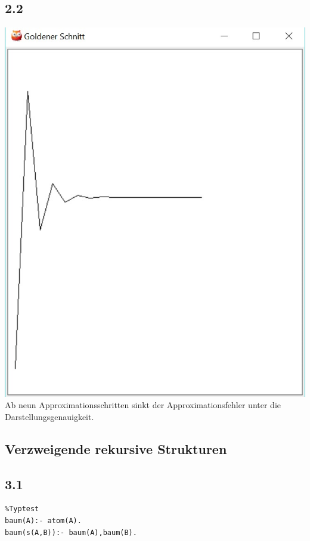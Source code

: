 \documentclass[a4paper, 11pt]{article}
\begin{document}
\newpage

\subsection*{2.2}

\includegraphics{display.png}\\

Ab neun Approximationsschritten sinkt der Approximationsfehler unter die Darstellungsgenauigkeit.

\subsection{Verzweigende rekursive Strukturen}

\subsection*{3.1}

\begin{verbatim}
%Typtest
baum(A):- atom(A).
baum(s(A,B)):- baum(A),baum(B).
\end{verbatim}
\end{document}
